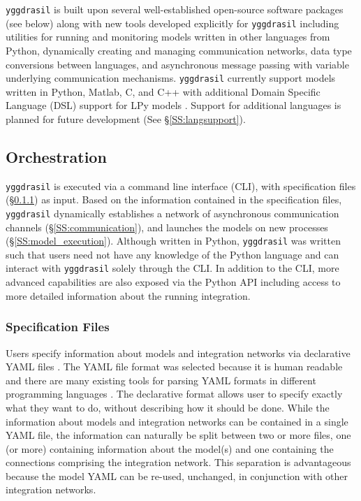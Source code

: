 \documentclass[journal]{IEEEtran}
\newcommand{\todo}[1]{{\color{red}{#1}}}
\newcommand{\pkg}{{\tt yggdrasil}{}}
\newcommand{\pkgrun}{{\tt \todo{cisrun}}}
\begin{document}
{\pkg} is built upon several well-established open-source software packages (see below) along with new tools developed explicitly for {\pkg} including utilities for running and monitoring models written in other languages from Python, dynamically creating and managing communication networks, data type conversions between languages, and asynchronous message passing with variable underlying communication mechanisms. {\pkg} currently support models written in Python, Matlab, C, and C++ with additional Domain Specific Language (DSL) support for LPy models \citep{Boudon2012}. Support for additional languages is planned for future development (See \S\ref{SS:langsupport}).

\subsection{Orchestration}\label{SS:orchestration}
%
{\pkg} is executed via a command line interface (CLI), {\pkgrun} with specification files (\S\ref{SSS:yaml}) as input. Based on the information contained in the specification files, {\pkg} dynamically establishes a network of asynchronous communication channels (\S\ref{SS:communication}), and launches the models on new processes (\S\ref{SS:model_execution}). Although written in Python, {\pkg} was written such that users need not have any knowledge of the Python language and can interact with {\pkg} solely through the CLI. In addition to the CLI, more advanced capabilities are also exposed via the Python API including access to more detailed information about the running integration.

\subsubsection{Specification Files}\label{SSS:yaml}
%
Users specify information about models and integration networks via declarative YAML files \citep{Ben-Kiki2009}. The YAML file format was selected because it is human readable and there are many existing tools for parsing YAML formats in different programming languages \citep[e.g.][]{Simonov2006,pyyaml,jsyaml}. The declarative format allows user to specify exactly what they want to do, without describing how it should be done. While the information about models and integration networks can be contained in a single YAML file, the information can naturally be split between two or more files, one (or more) containing information about the model(s) and one containing the connections comprising the integration network. This separation is advantageous because the model YAML can be re-used, unchanged, in conjunction with other integration networks. 
\end{document}
